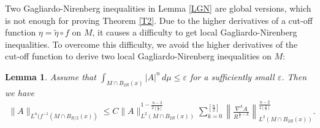 \documentclass{amsart}
\newtheorem{lemma}[theorem]{Lemma}
\theoremstyle{definition}
\numberwithin{equation}{section}
\begin{document}
Two  Gagliardo-Nirenberg  inequalities in Lemma \ref{LGN} are global versions, which is not enough for proving Theorem  \ref{T2}.  Due
to the
higher derivatives of a cut-off function $\eta = \tilde
\eta \circ f$ on $M$,   it causes a difficulty  to get local Gagliardo-Nirenberg  inequalities. To overcome this difficulty, we avoid the
higher derivatives of the cut-off function to derive two local
Gagliardo-Nirenberg  inequalities on $M$:
\begin{lemma}Assume  that $\int_{M \cap B_{2R}(x)}|A|^n\,d\mu\leq \varepsilon$ for a sufficiently small $\varepsilon$.
Then   we have
\begin{align}\label{Mu1.1}
\|A\|_{L^{n}(f^{-1} (M \cap B_{R/2}(x))}\leq C\| A\|^{1-\frac {n-2}{2[\frac n2]} }_{L^2(M \cap B_{2R}(x))}\sum_{k=0}^{[\frac n2]}\left \|\frac {\nabla^{k}
A}{R^{\frac
n2 -k}}\right \|^{ \frac {n-2}{2[\frac n2]}}_{L^2( M \cap B_{2R}(x) )}.
\end{align}
\end{lemma}
\end{document}
